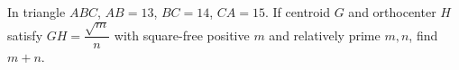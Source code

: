 In triangle $ABC$, $AB=13$, $BC=14$, $CA=15$. If centroid $G$ and orthocenter $H$ satisfy $GH=\dfrac{\sqrt m}{n}$ with square-free positive $m$ and relatively prime $m,n$, find $m+n$.
